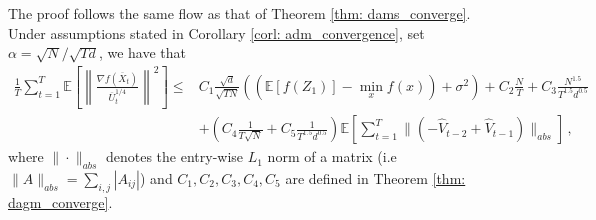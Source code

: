 \documentclass[11pt]{article}
\begin{document}
The proof follows the same flow as that of Theorem \ref{thm: dams_converge}. Under assumptions stated in Corollary \ref{corl: adm_convergence}, set $\alpha = \sqrt{N}/\sqrt{Td}$, we have that
\begin{align}\label{eq: rep_thm1bis}
	 \frac{1}{T}\sum_{t=1}^T  \mathbb E \left [\left\|\frac{\nabla f( \overline X_{t})}{\overline U_{t}^{1/4}}\right\|^2  \right] 
	\leq  & C_1 \frac{\sqrt{d}}{\sqrt{TN}} \left(( \mathbb E  [f( Z_{1})]  -  \min_x  f(x)) +    \sigma^2 \right)  +  C_2 \frac{N}{T}  +  C_3 \frac{N^{1.5}}{T^{1.5}d^{0.5}} 
	\nonumber \\
    &+  \left(C_4 \frac{1}{T\sqrt{N}} +  C_5   \frac{1}{T^{1.5}d^{0.5}}\right) 
\mathbb E \left[ \sum_{t=1}^{T}   \|    (- \hat V_{t-2} + \hat V_{t-1} ) \|_{abs} \right]  \, ,
\end{align}
where $\| \cdot\|_{abs}$  denotes the entry-wise $L_1$ norm of a matrix (i.e $\| A\|_{abs} = \sum_{i,j}{|A_{ij}|}$) and $C_1, C_2 ,C_3, C_4, C_5$ are defined in Theorem \ref{thm: dagm_converge}. 
\end{document}
